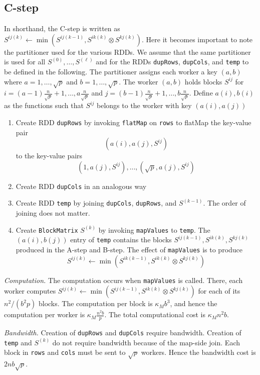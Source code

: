 \documentclass{article} %
\begin{document}
\subsection{C-step}

In shorthand, the C-step is written as $S^{ij(k)} \leftarrow \min(S^{ij(k-1)}, S^{ik(k)} \otimes S^{kj(k)})$.
Here it becomes important to note the partitioner used for the various RDDs.
We assume that the same partitioner is used for all $S^{(0)}, \hdots, S^{(\ell)}$
and for the RDDs {\tt dupRows}, {\tt dupCols}, and {\tt temp} to be defined in the following.
The partitioner assigns each worker a key $(a, b)$ where $a = 1,\hdots, \sqrt{p}$ and $b = 1,\hdots, \sqrt{p}$.
The worker $(a,b)$ holds blocks $S^{ij}$ for $i = (a-1)\frac{n}{\sqrt{p}} + 1,\hdots, a \frac{n}{\sqrt{p}}$ and $j = (b-1)\frac{n}{\sqrt{p}} + 1, \hdots, b\frac{n}{\sqrt{p}}$.
Define $a(i), b(i)$ as the functions such that $S^{ij}$ belongs to the worker with key $(a(i), a(j))$ 

\begin{enumerate}
\item Create RDD {\tt dupRows} by invoking {\tt flatMap} on {\tt rows} to flatMap the key-value pair
\[
(a(i), a(j), S^{ij})
\]
to the key-value pairs
\[
(1, a(j), S^{ij}), \hdots, (\sqrt{p}, a(j), S^{ij})
\]
\item Create RDD {\tt dupCols} in an analogous way
\item Create RDD {\tt temp} by joining {\tt dupCols}, {\tt dupRows},
  and $S^{(k-1)}$.  The order of joining does not matter.
\item Create {\tt BlockMatrix} $S^{(k)}$ by invoking {\tt mapValues}
  to {\tt temp}.  The $(a(i), b(j))$ entry of {\tt temp} contains the blocks
  $S^{ij(k-1)}, S^{ik(k)}, S^{kj(k)}$ produced in the A-step and
  B-step.  The effect of {\tt mapValues} is to produce
\[
S^{ij(k)} \leftarrow \min(S^{ik(k-1)}, S^{ik(k)} \otimes S^{kj(k)})
\]
\end{enumerate}

\emph{Computation.}  The computation occurs when {\tt mapValues} is
called.  There, each worker computes $S^{ij(k)} \leftarrow
\min(S^{ij(k-1)}, S^{ik(k)} \otimes S^{kj(k)})$ for each of its
$n^2/(b^2 p)$ blocks.  The computation per block is $\kappa_M b^3$, and
hence the computation per worker is $\kappa_M \frac{n^2b}{p}$.
The total computational cost is $\kappa_M n^2b$.

\emph{Bandwidth.} Creation of {\tt dupRows} and {\tt dupCols} require
bandwidth.  Creation of {\tt temp} and $S^{(k)}$ do not require
bandwidth because of the map-side join.  Each block in {\tt rows} and
{\tt cols} must be sent to $\sqrt{p}$ workers.
Hence the bandwidth cost is $2 n b \sqrt{p}$.
\end{document}
